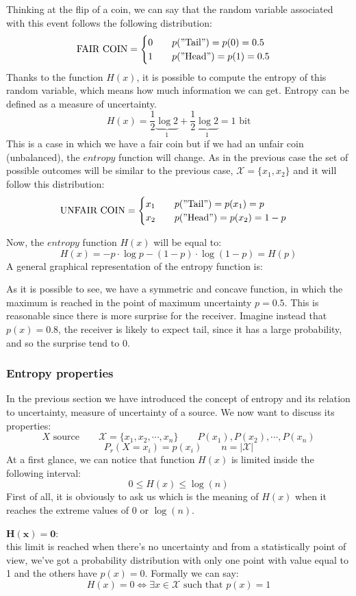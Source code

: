 \begin{exmp} Thinking at the flip of a coin, we can say that the random variable associated with this event follows the following distribution:
$$
\text{FAIR COIN} =
\begin{cases}
0 \qquad p("\text{Tail}") = p(0) = 0.5\\
1 \qquad p("\text{Head}") = p(1) = 0.5
\end{cases}
$$
Thanks to the function $H(x)$, it is possible to compute the entropy of this random variable, which means how much information we can get. Entropy can be defined as a measure of uncertainty.
$$H(x) = \frac{1}{2} \underbrace{\log 2}_{1} + \frac{1}{2} \underbrace{\log 2}_{1} = 1 \text{ bit}$$
This is a case in which we have a fair coin but if we had an unfair coin (unbalanced), the $entropy$ function will change. As in the previous case the set of possible outcomes will be similar to the previous case, $\mathcal{X} = \{x_1, x_2\}$ and it will follow this distribution:
$$
\text{UNFAIR COIN} =
\begin{cases}
x_1 \qquad p("\text{Tail}") = p(x_1) = p\\
x_2 \qquad p("\text{Head}") = p(x_2) = 1-p
\end{cases}
$$
\end{exmp}
\par \bigskip \noindent
Now, the $entropy$ function $H(x)$ will be equal to:
$$H(x) = -p \cdot \log p - (1-p) \cdot \log (1-p) = H(p)$$
A general graphical representation of the entropy function is:


As it is possible to see, we have a symmetric and concave function, in which the maximum is reached in the point of maximum uncertainty $p = 0.5$. This is reasonable since there is more surprise for the receiver. Imagine instead that $p(x) = 0.8$, the receiver is likely to expect tail, since it has a large probability, and so the surprise tend to $0$.

\subsubsection{Entropy properties}
In the previous section we have introduced the concept of entropy and its relation to uncertainty, measure of uncertainty of a source. We now want to discuss its properties:
$$X \text{ source} \qquad \mathcal{X} = \{x_1, x_2, \cdots, x_n\} \qquad P(x_1), P(x_2),\cdots, P(x_n) $$
$$P_r(X = x_i) = p(x_i) \qquad n = |\mathcal{X}|$$
At a first glance, we can notice that function $H(x)$ is limited inside the following interval:
$$0 \leq H(x) \leq \log(n)$$
First of all, it is obviously to ask us which is the meaning of $H(x)$ when it reaches the extreme values of $0$ or $\log(n)$.
\par \bigskip \noindent
$\mathbf{H(x) = 0}$:\\
this limit is reached when there's no uncertainty and from a statistically point of view, we've got a probability distribution with only one point with value equal to 1 and the others have $p(x) = 0$. Formally we can say:
$$H(x) = 0 \iff \exists x \in \mathcal{X} \text{ such that } p(x)=1$$

